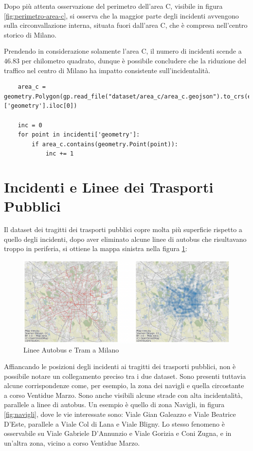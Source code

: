 \documentclass[a4paper]{report}
\begin{document}
Dopo più attenta osservazione del perimetro dell'area C, visibile in figura \ref{fig:perimetro-area-c}, 
si osserva che la maggior parte degli incidenti avvengono sulla circonvallazione interna, 
situata fuori dall'area C, che è compresa nell'centro storico di Milano.

Prendendo in considerazione solamente l'area C, il numero di incidenti scende a $46.83$ 
per chilometro quadrato, dunque è possibile concludere che la riduzione del traffico nel 
centro di Milano ha impatto consistente sull'incidentalità.

\begin{lstlisting}
    area_c = geometry.Polygon(gp.read_file("dataset/area_c/area_c.geojson").to_crs(epsg=3857)['geometry'].iloc[0])

    inc = 0
    for point in incidenti['geometry']: 
        if area_c.contains(geometry.Point(point)): 
            inc += 1
\end{lstlisting}

\section{Incidenti e Linee dei Trasporti Pubblici}

Il dataset dei tragitti dei trasporti pubblici copre molta più superficie rispetto a 
quello degli incidenti, dopo aver eliminato alcune linee di autobus che risultavano 
troppo in periferia, si ottiene la mappa sinistra nella figura \ref{fig:geo-trasporti}: 

\begin{figure}
    \includegraphics[width=\linewidth]{../src/atm/linee_atm.png}
    \caption{Linee Autobus e Tram a Milano}
    \label{fig:geo-trasporti}
\end{figure}

Affiancando le posizioni degli incidenti ai tragitti dei trasporti pubblici, 
non è possibile notare un collegamento preciso tra i due dataset. Sono presenti tuttavia alcune 
corrispondenze come, per esempio, la zona dei navigli e quella circostante a 
corso Ventidue Marzo. 
Sono anche visibili alcune strade con alta incidentalità, parallele a linee di autobus. 
Un esempio è quello di zona Navigli, in figura \ref{fig:navigli}, dove le vie interessate sono:
Viale Gian Galeazzo e Viale Beatrice D'Este, parallele a Viale Col di Lana e Viale Bligny.
Lo stesso fenomeno è osservabile su Viale Gabriele D'Annunzio e Viale Gorizia e Coni Zugna, 
e in un'altra zona, vicino a corso Ventidue Marzo.
\end{document}
